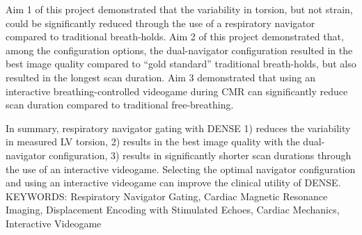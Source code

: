 Aim 1 of this project demonstrated that the variability in torsion, but not strain, could be significantly reduced through the use of a respiratory navigator compared to traditional breath-holds. Aim 2 of this project demonstrated that, among the configuration options, the dual-navigator configuration resulted in the best image quality compared to “gold standard” traditional breath-holds, but also resulted in the longest scan duration. Aim 3 demonstrated that using an interactive breathing-controlled videogame during CMR can significantly reduce scan duration compared to traditional free-breathing.

\restoregeometry
\thispagestyle{empty} %

In summary, respiratory navigator gating with DENSE 1) reduces the variability in measured LV torsion, 2) results in the best image quality with the dual-navigator configuration, 3) results in significantly shorter scan durations through the use of an interactive videogame. Selecting the optimal navigator configuration and using an interactive videogame can improve the clinical utility of DENSE.\\

\vspace{0.25in}
\noindent KEYWORDS: Respiratory Navigator Gating, Cardiac Magnetic Resonance Imaging, Displacement Encoding with Stimulated Echoes, Cardiac Mechanics, Interactive Videogame

\vspace{5.03125in}        %
					



